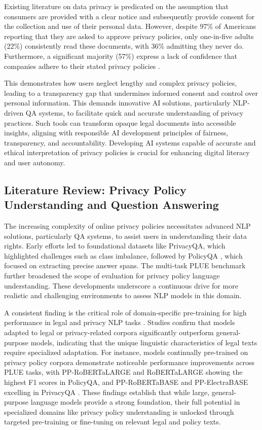 \documentclass[11pt]{article}
\begin{document}
Existing literature on data privacy is predicated on the assumption that consumers are provided with a clear notice and subsequently provide consent for the collection and use of their personal data. However, despite 97\% of Americans reporting that they are asked to approve privacy policies, only one-in-five adults (22\%) consistently read these documents, with 36\% admitting they never do. Furthermore, a significant majority (57\%) express a lack of confidence that companies adhere to their stated privacy policies \cite{auxier2019americans}.

This demonstrates how users neglect lengthy and complex privacy policies, leading to a transparency gap that undermines informed consent and control over personal information. This demands innovative AI solutions, particularly NLP-driven QA systems, to facilitate quick and accurate understanding of privacy practices. Such tools can transform opaque legal documents into accessible insights, aligning with responsible AI development principles of fairness, transparency, and accountability. Developing AI systems capable of accurate and ethical interpretation of privacy policies is crucial for enhancing digital literacy and user autonomy.

\subsection{Literature Review: Privacy Policy Understanding and Question Answering}

The increasing complexity of online privacy policies necessitates advanced NLP solutions, particularly QA systems, to assist users in understanding their data rights. Early efforts led to foundational datasets like PrivacyQA, which highlighted challenges such as class imbalance, followed by PolicyQA \cite{ahmad2020policyqa}, which focused on extracting precise answer spans. The multi-task PLUE \cite{chi2023plue} benchmark further broadened the scope of evaluation for privacy policy language understanding. These developments underscore a continuous drive for more realistic and challenging environments to assess NLP models in this domain.

A consistent finding is the critical role of domain-specific pre-training for high performance in legal and privacy NLP tasks \cite{greco2023bringing, song2022effectiveness}. Studies confirm that models adapted to legal or privacy-related corpora significantly outperform general-purpose models, indicating that the unique linguistic characteristics of legal texts require specialized adaptation. For instance, models continually pre-trained on privacy policy corpora demonstrate noticeable performance improvements across PLUE tasks, with PP-RoBERTaLARGE and RoBERTaLARGE showing the highest F1 scores in PolicyQA, and PP-RoBERTaBASE and PP-ElectraBASE excelling in PrivacyQA \cite{chi2023plue}. These findings establish that while large, general-purpose language models provide a strong foundation, their full potential in specialized domains like privacy policy understanding is unlocked through targeted pre-training or fine-tuning on relevant legal and policy texts.
\end{document}
